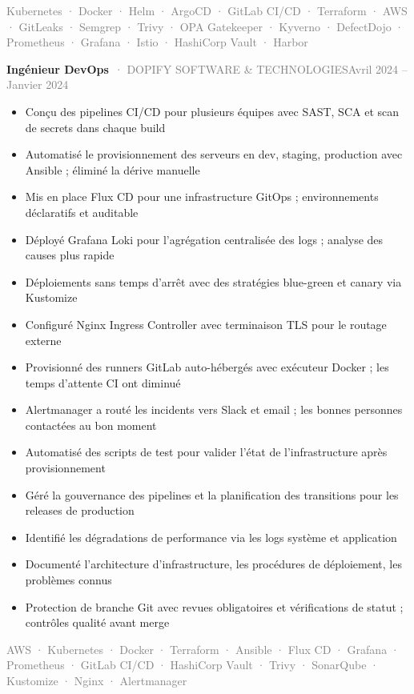 \documentclass[10pt,a4paper]{article}
\newcommand{\cventry}[3]{\textbf{#1}\ \textcolor{graytext}{· #2}\hfill\textcolor{graytext}{\small #3}\par}
\newcommand{\tagline}[1]{\textcolor{graytext}{\small #1}\par}
\begin{document}
\tagline{Kubernetes · Docker · Helm · ArgoCD · GitLab CI/CD · Terraform · AWS · GitLeaks · Semgrep · Trivy · OPA Gatekeeper · Kyverno · DefectDojo · Prometheus · Grafana · Istio · HashiCorp Vault · Harbor}
\vspace{1pt}
\vspace{3pt}
\cventry{Ingénieur DevOps}{DOPIFY SOFTWARE \& TECHNOLOGIES}{Avril 2024 – Janvier 2024}
\begin{itemize}
  \item Conçu des pipelines CI/CD pour plusieurs équipes avec SAST, SCA et scan de secrets dans chaque build
  \item Automatisé le provisionnement des serveurs en dev, staging, production avec Ansible ; éliminé la dérive manuelle
  \item Mis en place Flux CD pour une infrastructure GitOps ; environnements déclaratifs et auditable
  \item Déployé Grafana Loki pour l'agrégation centralisée des logs ; analyse des causes plus rapide
  \item Déploiements sans temps d'arrêt avec des stratégies blue-green et canary via Kustomize
  \item Configuré Nginx Ingress Controller avec terminaison TLS pour le routage externe
  \item Provisionné des runners GitLab auto-hébergés avec exécuteur Docker ; les temps d'attente CI ont diminué
  \item Alertmanager a routé les incidents vers Slack et email ; les bonnes personnes contactées au bon moment
  \item Automatisé des scripts de test pour valider l'état de l'infrastructure après provisionnement
  \item Géré la gouvernance des pipelines et la planification des transitions pour les releases de production
  \item Identifié les dégradations de performance via les logs système et application
  \item Documenté l'architecture d'infrastructure, les procédures de déploiement, les problèmes connus
  \item Protection de branche Git avec revues obligatoires et vérifications de statut ; contrôles qualité avant merge
\end{itemize}
\tagline{AWS · Kubernetes · Docker · Terraform · Ansible · Flux CD · Grafana · Prometheus · GitLab CI/CD · HashiCorp Vault · Trivy · SonarQube · Kustomize · Nginx · Alertmanager}
\vspace{1pt}
\end{document}
